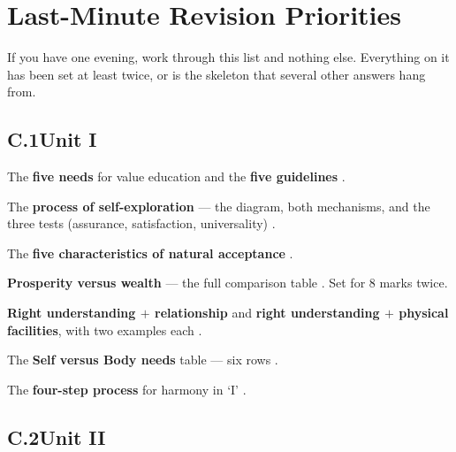\chapter{Last-Minute Revision Priorities}

If you have one evening, work through this list and nothing else. Everything
on it has been set at least twice, or is the skeleton that several other
answers hang from.

\section*{C.1\enspace Unit I}

\begin{abul}
\item The \textbf{five needs} for value education  and the
      \textbf{five guidelines} .
\item The \textbf{process of self-exploration} --- the diagram, both
      mechanisms, and the three tests (assurance, satisfaction, universality)
      .
\item The \textbf{five characteristics of natural acceptance} .
\item \textbf{Prosperity versus wealth} --- the full comparison table
      . Set for 8 marks twice.
\item \textbf{Right understanding $+$ relationship} and \textbf{right
      understanding $+$ physical facilities}, with two examples each
      .
\item The \textbf{Self versus Body needs} table --- six rows .
\item The \textbf{four-step process} for harmony in `I' .
\end{abul}

\section*{C.2\enspace Unit II}

